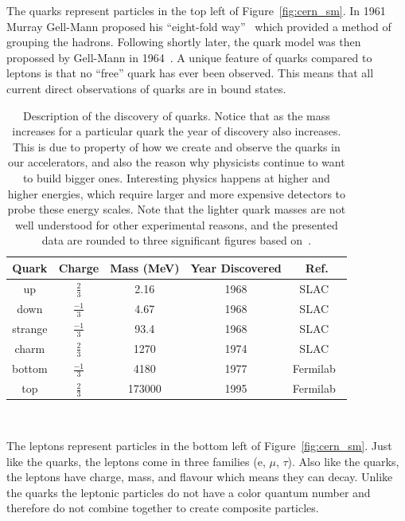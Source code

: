 The quarks represent particles in the top left of Figure~\ref{fig:cern_sm}.
In 1961 Murray Gell-Mann proposed his ``eight-fold way''~\citep{eightfold_way_osti_4008239} which provided a method of grouping the hadrons.
Following shortly later, the quark model was then propossed by Gell-Mann in 1964~\citep{quark_model_GELLMANN1964214}.
A unique feature of quarks compared to leptons is that no ``free'' quark has ever been observed.
This means that all current direct observations of quarks are in bound states.

\begin{table}
\begin{center}
\begin{tabular}{||c c c c c||}
 \hline
 Quark & Charge & Mass (MeV) & Year Discovered & Ref.\\ [0.5ex]
 \hline\hline
 up & $\frac{2}{3}$ & 2.16 & 1968 & SLAC~\citep{1969PhRvL..23..930B, 1969PhRvL..23..935B} \\
 \hline
 down & $\frac{-1}{3}$ & 4.67 & 1968 & SLAC~\citep{1969PhRvL..23..930B, 1969PhRvL..23..935B} \\
 \hline
 strange & $\frac{-1}{3}$ & 93.4 & 1968 & SLAC~\citep{1969PhRvL..23..930B, 1969PhRvL..23..935B} \\
 \hline
 charm & $\frac{2}{3}$ & 1270 & 1974 & SLAC~\citep{Jpsi_PhysRevLett.33.1404} \\
 \hline
 bottom & $\frac{-1}{3}$ & 4180 & 1977 & Fermilab~\citep{bottom_PhysRevLett.39.252}\\
 \hline
 top & $\frac{2}{3}$ & 173000 & 1995 & Fermilab~\citep{topquark_Abachi_1995} \\
 \hline
\end{tabular}
\caption{Description of the discovery of quarks.
  Notice that as the mass increases for a particular quark the year of discovery also increases.
  This is due to property of how we create and observe the quarks in our accelerators, and also the reason why physicists continue to want to build bigger ones.
  Interesting physics happens at higher and higher energies, which require larger and more expensive detectors to probe these energy scales.
  Note that the lighter quark masses are not well understood for other experimental reasons, and the presented data are rounded to three significant figures based on~\citep{Workman:2022ynf}.}
\end{center}
\end{table}
~\label{table:quark}

The leptons represent particles in the bottom left of Figure~\ref{fig:cern_sm}.
Just like the quarks, the leptons come in three families (e, $\mu$, $\tau$).
Also like the quarks, the leptons have charge, mass, and flavour which means they can decay.
Unlike the quarks the leptonic particles do not have a color quantum number and therefore do not combine together to create composite particles.

